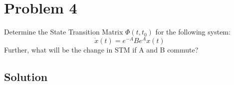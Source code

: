 \section*{Problem 4}

Determine the State Transition Matrix \( \Phi(t,t_0) \) for the following system:
\begin{equation*}
    \dot x(t)
    =
    e^{-A} B e^A x(t)
\end{equation*}
Further, what will be the change in STM if A and B commute?

\subsection*{Solution}
